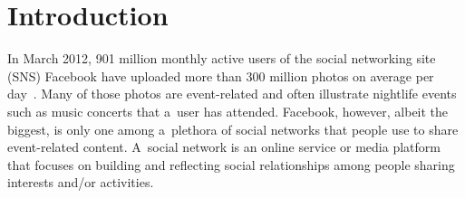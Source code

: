 \documentclass[runningheads,a4paper]{llncs}
\begin{document}

\section{Introduction}                                                      \label{sec:introduction}
In March 2012, 901 million monthly active users of the social networking site (SNS) Facebook have uploaded more than 300 million photos on average per day~\cite{Facebook2012}. Many of those photos are event-related and often illustrate nightlife events such as music concerts that a~user has attended. Facebook, however, albeit the biggest, is only one among a~plethora of social networks that people use to share event-related content.
A~social network is an online service or media platform that focuses on building and reflecting social relationships among people sharing interests and/or activities.
\end{document}
